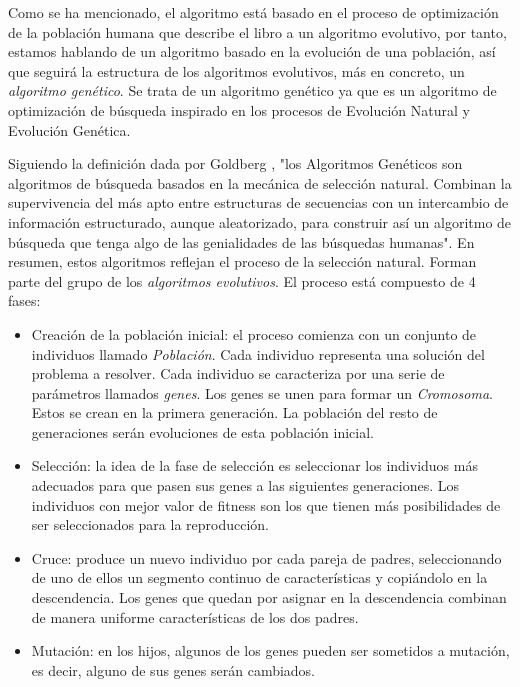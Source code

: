 Como se ha mencionado, el algoritmo está basado en el proceso de optimización de la población humana que describe el libro 
a un algoritmo evolutivo, por tanto, estamos hablando de un algoritmo basado en la evolución de una población, así que seguirá 
la estructura de los algoritmos evolutivos, más en concreto, un \emph{algoritmo genético}. Se trata de un algoritmo 
genético ya que es un algoritmo de optimización de búsqueda inspirado en los procesos de Evolución Natural y
Evolución Genética.

Siguiendo la definición dada por Goldberg \cite{goldberg89}, "los Algoritmos Genéticos son algoritmos de búsqueda
basados en la mecánica de selección natural. Combinan la supervivencia del más apto entre estructuras de secuencias con un intercambio de 
información estructurado, aunque aleatorizado, para construir así un algoritmo de búsqueda que tenga algo de las genialidades de las 
búsquedas humanas". En resumen, estos algoritmos reflejan el proceso de la selección natural. Forman parte del grupo de 
los \emph{algoritmos evolutivos}. El proceso está compuesto de 4 fases:

\begin{itemize}
    \item Creación de la población inicial: el proceso comienza con un conjunto de individuos llamado \emph{Población}. Cada individuo
    representa una solución del problema a resolver. Cada individuo se caracteriza por una serie de parámetros llamados
    \emph{genes}. Los genes se unen para formar un \emph{Cromosoma}. Estos se crean en la primera generación. La población del 
    resto de generaciones serán evoluciones de esta población inicial.
    \item Selección: la idea de la fase de selección es seleccionar los individuos más adecuados para que pasen sus
    genes a las siguientes generaciones. Los individuos con mejor valor de fitness son los que tienen más posibilidades
    de ser seleccionados para la reproducción.
    \item Cruce: produce un nuevo individuo por cada pareja de padres, seleccionando de uno de ellos un segmento
    continuo de características y copiándolo en la descendencia. Los genes que quedan por asignar en la descendencia
    combinan de manera uniforme características de los dos padres.
    \item Mutación: en los hijos, algunos de los genes pueden ser sometidos a mutación, es decir, alguno de sus genes
    serán cambiados.
\end{itemize}

